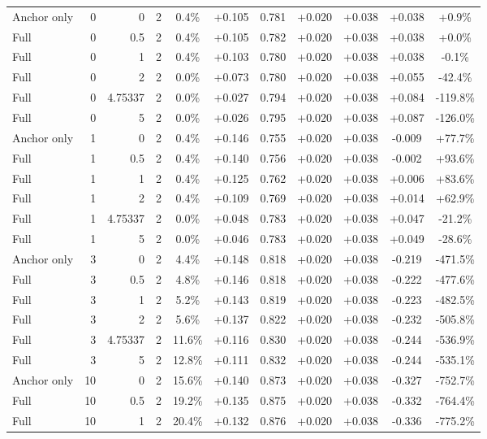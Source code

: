 \begin{table}[htbp]
\begin{tabular}{lrrrccccccc}
Anchor only & 0 & 0 & 2 & 0.4\% & +0.105 & 0.781 & +0.020 & +0.038 & +0.038 & +0.9\% \\
Full & 0 & 0.5 & 2 & 0.4\% & +0.105 & 0.782 & +0.020 & +0.038 & +0.038 & +0.0\% \\
Full & 0 & 1 & 2 & 0.4\% & +0.103 & 0.780 & +0.020 & +0.038 & +0.038 & -0.1\% \\
Full & 0 & 2 & 2 & 0.0\% & +0.073 & 0.780 & +0.020 & +0.038 & +0.055 & -42.4\% \\
Full & 0 & 4.75337 & 2 & 0.0\% & +0.027 & 0.794 & +0.020 & +0.038 & +0.084 & -119.8\% \\
Full & 0 & 5 & 2 & 0.0\% & +0.026 & 0.795 & +0.020 & +0.038 & +0.087 & -126.0\% \\
Anchor only & 1 & 0 & 2 & 0.4\% & +0.146 & 0.755 & +0.020 & +0.038 & -0.009 & +77.7\% \\
Full & 1 & 0.5 & 2 & 0.4\% & +0.140 & 0.756 & +0.020 & +0.038 & -0.002 & +93.6\% \\
Full & 1 & 1 & 2 & 0.4\% & +0.125 & 0.762 & +0.020 & +0.038 & +0.006 & +83.6\% \\
Full & 1 & 2 & 2 & 0.4\% & +0.109 & 0.769 & +0.020 & +0.038 & +0.014 & +62.9\% \\
Full & 1 & 4.75337 & 2 & 0.0\% & +0.048 & 0.783 & +0.020 & +0.038 & +0.047 & -21.2\% \\
Full & 1 & 5 & 2 & 0.0\% & +0.046 & 0.783 & +0.020 & +0.038 & +0.049 & -28.6\% \\
Anchor only & 3 & 0 & 2 & 4.4\% & +0.148 & 0.818 & +0.020 & +0.038 & -0.219 & -471.5\% \\
Full & 3 & 0.5 & 2 & 4.8\% & +0.146 & 0.818 & +0.020 & +0.038 & -0.222 & -477.6\% \\
Full & 3 & 1 & 2 & 5.2\% & +0.143 & 0.819 & +0.020 & +0.038 & -0.223 & -482.5\% \\
Full & 3 & 2 & 2 & 5.6\% & +0.137 & 0.822 & +0.020 & +0.038 & -0.232 & -505.8\% \\
Full & 3 & 4.75337 & 2 & 11.6\% & +0.116 & 0.830 & +0.020 & +0.038 & -0.244 & -536.9\% \\
Full & 3 & 5 & 2 & 12.8\% & +0.111 & 0.832 & +0.020 & +0.038 & -0.244 & -535.1\% \\
Anchor only & 10 & 0 & 2 & 15.6\% & +0.140 & 0.873 & +0.020 & +0.038 & -0.327 & -752.7\% \\
Full & 10 & 0.5 & 2 & 19.2\% & +0.135 & 0.875 & +0.020 & +0.038 & -0.332 & -764.4\% \\
Full & 10 & 1 & 2 & 20.4\% & +0.132 & 0.876 & +0.020 & +0.038 & -0.336 & -775.2\% \\

\end{tabular}
\end{table}
